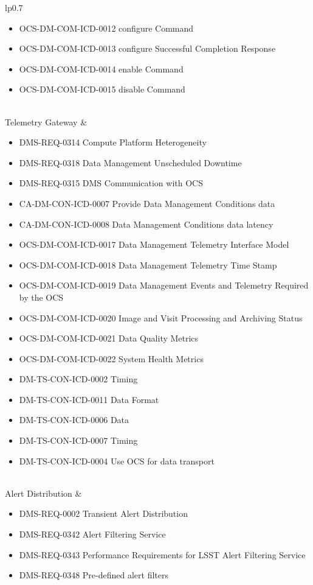 \begin{xtabular}{lp{0.7\textwidth}}
\begin{itemize}
\item OCS-DM-COM-ICD-0012 configure Command
\item OCS-DM-COM-ICD-0013 configure Successful Completion Response
\item OCS-DM-COM-ICD-0014 enable Command
\item OCS-DM-COM-ICD-0015 disable Command
\end{itemize} \\ \hline
Telemetry Gateway &
\begin{itemize}DMS-REQ-0008 Pipeline Availability
\item DMS-REQ-0314 Compute Platform Heterogeneity
\item DMS-REQ-0318 Data Management Unscheduled Downtime
\item DMS-REQ-0315 DMS Communication with OCS
\item CA-DM-CON-ICD-0007 Provide Data Management Conditions data
\item CA-DM-CON-ICD-0008 Data Management Conditions data latency
\item OCS-DM-COM-ICD-0017 Data Management Telemetry Interface Model
\item OCS-DM-COM-ICD-0018 Data Management Telemetry Time Stamp
\item OCS-DM-COM-ICD-0019 Data Management Events and Telemetry Required by the OCS
\item OCS-DM-COM-ICD-0020 Image and Visit Processing and Archiving Status
\item OCS-DM-COM-ICD-0021 Data Quality Metrics
\item OCS-DM-COM-ICD-0022 System Health Metrics
\item DM-TS-CON-ICD-0002 Timing
\item DM-TS-CON-ICD-0011 Data Format
\item DM-TS-CON-ICD-0006 Data
\item DM-TS-CON-ICD-0007 Timing
\item DM-TS-CON-ICD-0004 Use OCS for data transport
\end{itemize} \\ \hline
Alert Distribution &
\begin{itemize}DMS-REQ-0004 Nightly Data Accessible Within 24 hrs
\item DMS-REQ-0002 Transient Alert Distribution
\item DMS-REQ-0342 Alert Filtering Service
\item DMS-REQ-0343 Performance Requirements for LSST Alert Filtering Service
\item DMS-REQ-0348 Pre-defined alert filters

\end{itemize}
\end{xtabular}
